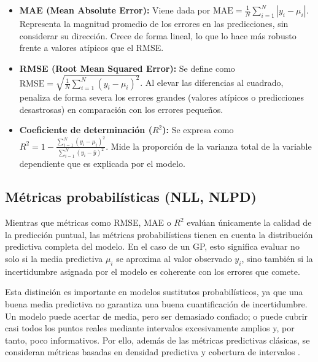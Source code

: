 \begin{itemize}

    \item \textbf{MAE (Mean Absolute Error):} Viene dada por $\text{MAE} = \frac{1}{N} \sum_{i=1}^{N} |y_i - \mu_i|$.
    Representa la magnitud promedio de los errores en las predicciones, sin considerar su dirección. Crece de forma lineal, lo que lo hace más robusto frente a valores atípicos que el RMSE.
    
    \item \textbf{RMSE (Root Mean Squared Error):} Se define como $\text{RMSE} = \sqrt{\frac{1}{N} \sum_{i=1}^{N} (y_i - \mu_i)^2}$. Al elevar las diferencias al cuadrado, penaliza de forma severa los errores grandes (valores atípicos o predicciones desastrosas) en comparación con los errores pequeños.
       
    \item \textbf{Coeficiente de determinación ($R^2$):} Se expresa como $R^2 = 1 - \frac{\sum_{i=1}^{N} (y_i - \mu_i)^2}{\sum_{i=1}^{N} (y_i - \bar{y})^2}$. Mide la proporción de la varianza total de la variable dependiente que es explicada por el modelo.
    
\end{itemize}

\subsection{Métricas probabilísticas (NLL, NLPD)} %

Mientras que métricas como RMSE, MAE o \(R^2\) evalúan únicamente la calidad de la
predicción puntual, las métricas probabilísticas tienen en cuenta la distribución predictiva
completa del modelo. En el caso de un GP, esto significa evaluar no solo si
la media predictiva \(\mu_i\) se aproxima al valor observado \(y_i\), sino también si la
incertidumbre asignada por el modelo es coherente con los errores que comete.

Esta distinción es importante en modelos sustitutos probabilísticos, ya que una buena media
predictiva no garantiza una buena cuantificación de incertidumbre. Un modelo puede acertar
de media, pero ser demasiado confiado; o puede cubrir casi todos los puntos reales mediante
intervalos excesivamente amplios y, por tanto, poco informativos. Por ello, además de las
métricas predictivas clásicas, se consideran métricas basadas en densidad predictiva y
cobertura de intervalos \cite{rasmussen2006gpml,gneiting2007proper,kuleshov2018accurate}.

